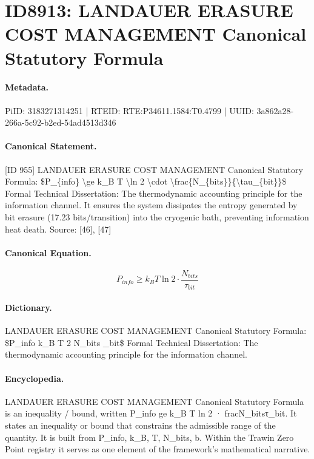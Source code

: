 \section*{ID8913: LANDAUER ERASURE COST MANAGEMENT Canonical Statutory Formula}
\paragraph{Metadata.}
PiID: 3183271314251 | RTEID: RTE:P34611.1584:T0.4799 | UUID: 3a862a28-266a-5c92-b2ed-54ad4513d346

\paragraph{Canonical Statement.}
[ID 955] LANDAUER ERASURE COST MANAGEMENT Canonical Statutory Formula: \$P\_\{info\} \textbackslash{}ge k\_B T \textbackslash{}ln 2 \textbackslash{}cdot \textbackslash{}frac\{N\_\{bits\}\}\{\textbackslash{}tau\_\{bit\}\}\$ Formal Technical Dissertation: The thermodynamic accounting principle for the information channel. It ensures the system dissipates the entropy generated by bit erasure (17.23 bits/transition) into the cryogenic bath, preventing information heat death. Source: [46], [47]

\paragraph{Canonical Equation.}
\[
P_{info} \ge k_B T \ln 2 \cdot \frac{N_{bits}}{\tau_{bit}}
\]

\paragraph{Dictionary.}
LANDAUER ERASURE COST MANAGEMENT Canonical Statutory Formula: \$P\_info k\_B T 2 N\_bits \_bit\$ Formal Technical Dissertation: The thermodynamic accounting principle for the information channel.

\paragraph{Encyclopedia.}
LANDAUER ERASURE COST MANAGEMENT Canonical Statutory Formula is an inequality / bound, written P\_info ge k\_B T ln 2 · fracN\_bitsτ\_bit. It states an inequality or bound that constrains the admissible range of the quantity. It is built from P\_info, k\_B, T, N\_bits, b. Within the Trawin Zero Point registry it serves as one element of the framework's mathematical narrative.
